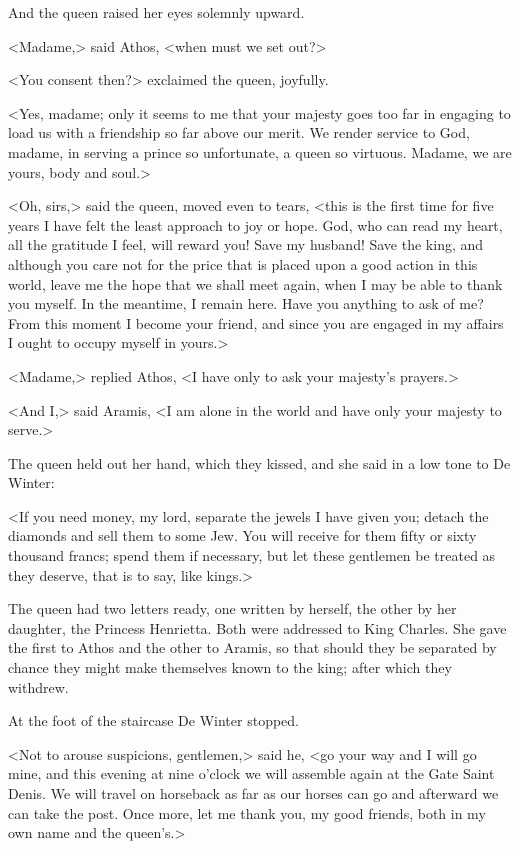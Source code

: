 And the queen raised her eyes solemnly upward.

<Madame,> said Athos, <when must we set out?>

<You consent then?> exclaimed the queen, joyfully.

<Yes, madame; only it seems to me that your majesty goes too far in engaging to load us with a friendship so far above our merit. We render service to God, madame, in serving a prince so unfortunate, a queen so virtuous. Madame, we are yours, body and soul.>

<Oh, sirs,> said the queen, moved even to tears, <this is the first time for five years I have felt the least approach to joy or hope. God, who can read my heart, all the gratitude I feel, will reward you! Save my husband! Save the king, and although you care not for the price that is placed upon a good action in this world, leave me the hope that we shall meet again, when I may be able to thank you myself. In the meantime, I remain here. Have you anything to ask of me? From this moment I become your friend, and since you are engaged in my affairs I ought to occupy myself in yours.>

<Madame,> replied Athos, <I have only to ask your majesty's prayers.>

<And I,> said Aramis, <I am alone in the world and have only your majesty to serve.>

The queen held out her hand, which they kissed, and she said in a low tone to De Winter:

<If you need money, my lord, separate the jewels I have given you; detach the diamonds and sell them to some Jew. You will receive for them fifty or sixty thousand francs; spend them if necessary, but let these gentlemen be treated as they deserve, that is to say, like kings.>

The queen had two letters ready, one written by herself, the other by her daughter, the Princess Henrietta. Both were addressed to King Charles. She gave the first to Athos and the other to Aramis, so that should they be separated by chance they might make themselves known to the king; after which they withdrew.

At the foot of the staircase De Winter stopped.

<Not to arouse suspicions, gentlemen,> said he, <go your way and I will go mine, and this evening at nine o'clock we will assemble again at the Gate Saint Denis. We will travel on horseback as far as our horses can go and afterward we can take the post. Once more, let me thank you, my good friends, both in my own name and the queen's.>

